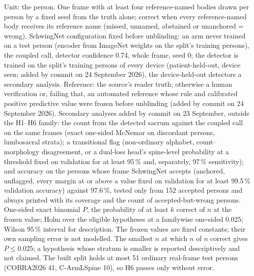 \begin{table}[p]
{\begin{minipage}{23.2cm}
Unit: the person. One frame with at least four reference-named bodies drawn per person by a fixed seed from the truth alone; correct when every reference-named body receives its reference name (missed, unnamed, abstained or unanchored = wrong). SchwingNet configuration fixed before unblinding: an arm never trained on a test person (encoder from ImageNet weights on the split's training persons), the coupled call, detector confidence 0.74, whole frame, seed 0; the detector is trained on the split's training persons of every device (patient-held-out, device seen; added by commit on 24 September 2026), the device-held-out detectors a secondary analysis. Reference: the source's reader truth; otherwise a human verification or, failing that, an automated reference whose rule and calibrated positive predictive value were frozen before unblinding (added by commit on 24 September 2026). Secondary analyses added by commit on 23 September, outside the H1--H6 family: the count from the detected sacrum against the coupled call on the same frames (exact one-sided McNemar on discordant persons, lumbosacral strata); a transitional flag (non-ordinary alphabet, count--morphology disagreement, or a dual-loss head's spine-level probability at a threshold fixed on validation for at least 95\,\% and, separately, 97\,\% sensitivity); and accuracy on the persons whose frame SchwingNet accepts (anchored, unflagged, every margin at or above a value fixed on validation for at least 99.5\,\% validation accuracy) against 97.6\,\%, tested only from 152 accepted persons and always printed with its coverage and the count of accepted-but-wrong persons. One-sided exact binomial $P$, the probability of at least $k$ correct of $n$ at the frozen value; Holm over the eligible hypotheses at a familywise one-sided 0.025; Wilson 95\,\% interval for description. The frozen values are fixed constants; their own sampling error is not modelled.
The smallest $n$ at which $n$ of $n$ correct gives $P \le 0.025$; a hypothesis whose stratum is smaller is reported descriptively and not claimed. The built split holds at most 51 ordinary real-frame test persons (COBRA2026 41, C-ArmLSpine 10), so H6 passes only without error.
\par\endgroup
\end{minipage}}
\endgroup
\end{table}
